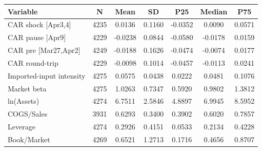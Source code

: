 \begin{tabular}{lcccccc}
\toprule
Variable & N & Mean & SD & P25 & Median & P75 \\
\midrule
CAR shock [Apr3,4] & 4235 & 0.0136 & 0.1160 & -0.0352 & 0.0090 & 0.0571 \\
CAR pause [Apr9] & 4229 & -0.0238 & 0.0844 & -0.0580 & -0.0178 & 0.0159 \\
CAR pre [Mar27,Apr2] & 4249 & -0.0188 & 0.1626 & -0.0474 & -0.0074 & 0.0177 \\
CAR round-trip & 4229 & -0.0098 & 0.1014 & -0.0457 & -0.0113 & 0.0241 \\
Imported-input intensity & 4275 & 0.0575 & 0.0438 & 0.0222 & 0.0481 & 0.1076 \\
Market beta & 4275 & 1.0263 & 0.7347 & 0.5920 & 0.9802 & 1.3812 \\
ln(Assets) & 4274 & 6.7511 & 2.5846 & 4.8897 & 6.9945 & 8.5952 \\
COGS/Sales & 3931 & 0.6293 & 0.3400 & 0.3902 & 0.6020 & 0.7857 \\
Leverage & 4274 & 0.2926 & 0.4151 & 0.0533 & 0.2134 & 0.4228 \\
Book/Market & 4269 & 0.6521 & 1.2713 & 0.1716 & 0.4656 & 0.8707 \\
\bottomrule
\end{tabular}